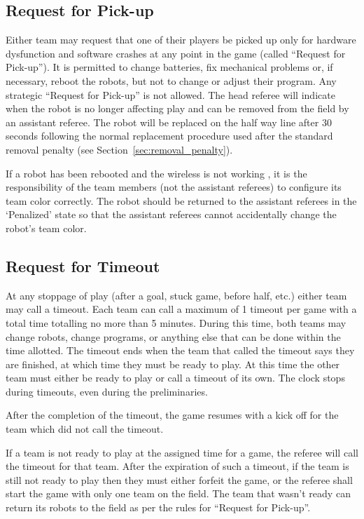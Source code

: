 \documentclass[12pt]{article}
\begin{document}
\subsection{Request for Pick-up}
Either team may request that one of their players be picked up only
for hardware dysfunction and software crashes at any point in the
game (called ``Request for Pick-up''). It is permitted to change
batteries, fix mechanical problems or, if necessary, reboot the
robots, but not to change or adjust their program. Any strategic
``Request for Pick-up'' is not allowed.  The head referee will
indicate when the robot is no longer affecting play and can be
removed from the field by an assistant referee.  The robot will be
replaced on the half way line after 30 seconds following the normal
replacement procedure used after the standard removal penalty (see
Section~\ref{sec:removal_penalty}).

If a robot has been rebooted and the wireless is not working
, it is
the responsibility of the team members (not the assistant referees)
to configure its team color correctly.  The robot should be returned
to the assistant referees in the `Penalized' state so that the
assistant referees cannot accidentally change the robot's team color.

\subsection{Request for Timeout}

At any stoppage of play (after a goal, stuck game, before half,
etc.) either team may call a timeout.  Each team can call a maximum
of 1 timeout per game with a total time totalling no more than 5
minutes.  During this time, both teams may change robots, change
programs, or anything else that can be done within the time
allotted.  The timeout ends when the team that called the timeout
says they are finished, at which time they must be ready to play. At
this time the other team must either be ready to play or call a
timeout of its own.  The clock stops during timeouts, even during
the preliminaries.

After the completion of the timeout, the game resumes with a kick
off for the team which did not call the timeout.

If a team is not ready to play at the assigned time for a game, the
referee will call the timeout for that team.  After the expiration
of such a timeout, if the team is still not ready to play then they
must either forfeit the game, or the referee shall start the game with
only one team on the field.  The team that wasn't ready can return
its robots to the field as per the rules for ``Request for Pick-up''.
\end{document}
